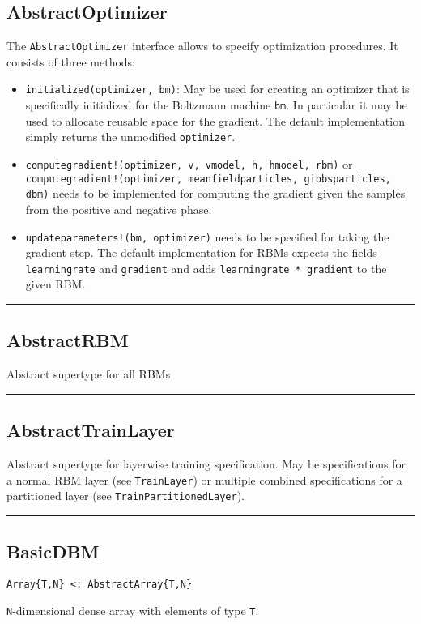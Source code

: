\subsection*{AbstractOptimizer}
The \texttt{AbstractOptimizer} interface allows to specify optimization procedures. It consists of three methods:

\begin{itemize}
\item \texttt{initialized(optimizer, bm)}: May be used for creating an optimizer that is  specifically initialized for the Boltzmann machine \texttt{bm}.  In particular it may be used to allocate reusable space for the gradient.  The default implementation simply returns the unmodified \texttt{optimizer}.


\item \texttt{computegradient!(optimizer, v, vmodel, h, hmodel, rbm)} or \texttt{computegradient!(optimizer, meanfieldparticles, gibbsparticles, dbm)}  needs to be implemented for computing the gradient given the samples  from the positive and negative phase.


\item \texttt{updateparameters!(bm, optimizer)} needs to be specified for taking the  gradient step. The default implementation for RBMs expects the fields  \texttt{learningrate} and \texttt{gradient} and adds \texttt{learningrate * gradient} to the  given RBM.

\end{itemize}
\noindent\rule{\textwidth}{1pt}
\subsection*{AbstractRBM}
Abstract supertype for all RBMs 

\noindent\rule{\textwidth}{1pt}
\subsection*{AbstractTrainLayer}
Abstract supertype for layerwise training specification. May be specifications for a normal RBM layer (see \texttt{TrainLayer}) or multiple combined specifications for a partitioned layer (see \texttt{TrainPartitionedLayer}).

\noindent\rule{\textwidth}{1pt}
\subsection*{BasicDBM}
\begin{verbatim}
Array{T,N} <: AbstractArray{T,N}
\end{verbatim}
\texttt{N}-dimensional dense array with elements of type \texttt{T}.

